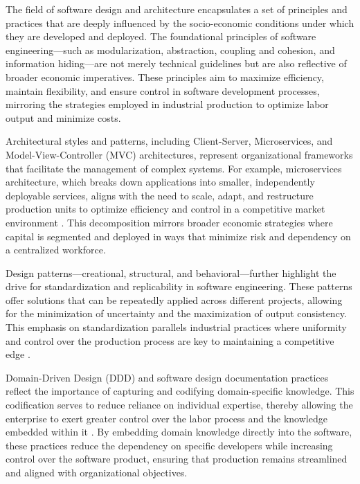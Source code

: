 \begin{refsection}
The field of software design and architecture encapsulates a set of principles and practices that are deeply influenced by the socio-economic conditions under which they are developed and deployed. The foundational principles of software engineering—such as modularization, abstraction, coupling and cohesion, and information hiding—are not merely technical guidelines but are also reflective of broader economic imperatives. These principles aim to maximize efficiency, maintain flexibility, and ensure control in software development processes, mirroring the strategies employed in industrial production to optimize labor output and minimize costs.

Architectural styles and patterns, including Client-Server, Microservices, and Model-View-Controller (MVC) architectures, represent organizational frameworks that facilitate the management of complex systems. For example, microservices architecture, which breaks down applications into smaller, independently deployable services, aligns with the need to scale, adapt, and restructure production units to optimize efficiency and control in a competitive market environment \cite[pp.~45-47]{Fowler2016}. This decomposition mirrors broader economic strategies where capital is segmented and deployed in ways that minimize risk and dependency on a centralized workforce.

Design patterns—creational, structural, and behavioral—further highlight the drive for standardization and replicability in software engineering. These patterns offer solutions that can be repeatedly applied across different projects, allowing for the minimization of uncertainty and the maximization of output consistency. This emphasis on standardization parallels industrial practices where uniformity and control over the production process are key to maintaining a competitive edge \cite[pp.~103-105]{Gamma2015}.

Domain-Driven Design (DDD) and software design documentation practices reflect the importance of capturing and codifying domain-specific knowledge. This codification serves to reduce reliance on individual expertise, thereby allowing the enterprise to exert greater control over the labor process and the knowledge embedded within it \cite[pp.~32-35]{Evans2008}. By embedding domain knowledge directly into the software, these practices reduce the dependency on specific developers while increasing control over the software product, ensuring that production remains streamlined and aligned with organizational objectives.


\end{refsection}

